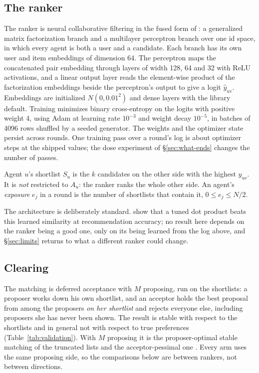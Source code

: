 \subsection{The ranker}
\label{sec:ranker}

The ranker is neural collaborative filtering in the fused form of
\citet{he2017}: a generalized matrix factorization branch and a multilayer
perceptron branch over one id space, in which every agent is both a user and a
candidate. Each branch has its own user and item embeddings of dimension 64. The
perceptron maps the concatenated pair embedding through layers of width 128, 64
and 32 with ReLU activations, and a linear output layer reads the element-wise
product of the factorization embeddings beside the perceptron's output to give a
logit $\hat y_{uv}$. Embeddings are initialized $N(0, 0.01^2)$ and dense layers
with the library default. Training minimizes binary cross-entropy on the logits
with positive weight 4, using Adam \citep{kingma2015} at learning rate $10^{-3}$
and weight decay $10^{-5}$, in batches of 4096 rows shuffled by a seeded
generator. The weights and the optimizer state persist across rounds. One
training pass over a round's log is about \stepsPerPass{} optimizer steps at the
shipped values; the dose experiment of \S\ref{sec:what-ends} changes the number
of passes.

Agent $u$'s shortlist $S_u$ is the $k$ candidates on the other side with the
highest $\hat y_{uv}$. It is \emph{not} restricted to $A_u$: the ranker ranks the
whole other side. An agent's \emph{exposure} $e_j$ in a round is the number of
shortlists that contain it, $0 \le e_j \le N/2$.

The architecture is deliberately standard. \citet{rendle2020} show that a tuned
dot product beats this learned similarity at recommendation accuracy; no result
here depends on the ranker being a good one, only on its being learned from the
log above, and \S\ref{sec:limits} returns to what a different ranker could
change.

\subsection{Clearing}
\label{sec:clearing}

The matching is deferred acceptance \citep{gale1962} with $M$ proposing, run on
the shortlists: a proposer works down his own shortlist, and an acceptor holds
the best proposal from among the proposers \emph{on her shortlist} and rejects
everyone else, including proposers she has never been shown. The result is
stable with respect to the shortlists and in general not with respect to true
preferences (Table~\ref{tab:validation}). With $M$ proposing it is the
proposer-optimal stable matching of the truncated lists and the acceptor-pessimal
one \citep{roth1982,knuth1996}. Every arm uses the same proposing side, so the
comparisons below are between rankers, not between directions.

